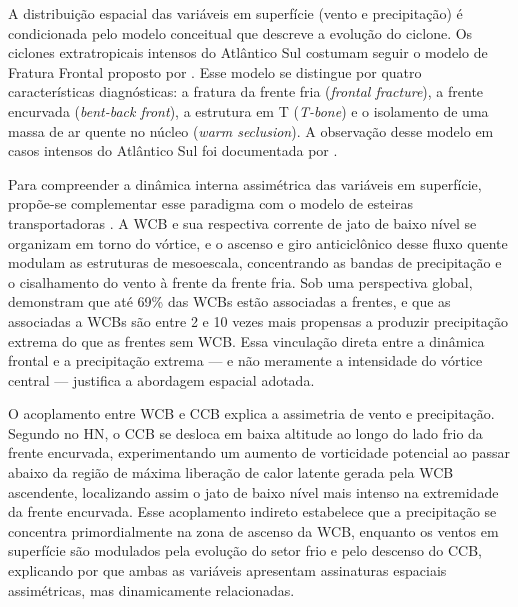 A distribuição espacial das variáveis em superfície (vento e precipitação) é condicionada pelo modelo conceitual que descreve a evolução do ciclone.
Os ciclones extratropicais intensos do Atlântico Sul costumam seguir o modelo de Fratura Frontal proposto por \citet{shapiro1990life}.
Esse modelo se distingue por quatro características diagnósticas: a fratura da frente fria (\textit{frontal fracture}), a frente encurvada (\textit{bent-back front}), a estrutura em T (\textit{T-bone}) e o isolamento de uma massa de ar quente no núcleo (\textit{warm seclusion}).
A observação desse modelo em casos intensos do Atlântico Sul foi documentada por \citet{shapiro1999bridge}.

Para compreender a dinâmica interna assimétrica das variáveis em superfície, propõe-se complementar esse paradigma com o modelo de esteiras transportadoras \citep{browning1986conceptual}.
A WCB e sua respectiva corrente de jato de baixo nível se organizam em torno do vórtice, e o ascenso e giro anticiclônico desse fluxo quente modulam as estruturas de mesoescala, concentrando as bandas de precipitação e o cisalhamento do vento à frente da frente fria.
Sob uma perspectiva global, \citet{catto2015fronts} demonstram que até 69\% das WCBs estão associadas a frentes, e que as associadas a WCBs são entre 2 e 10 vezes mais propensas a produzir precipitação extrema do que as frentes sem WCB.
Essa vinculação direta entre a dinâmica frontal e a precipitação extrema — e não meramente a intensidade do vórtice central — justifica a abordagem espacial adotada.

O acoplamento entre WCB e CCB explica a assimetria de vento e precipitação.
Segundo \citet{schemm2014ccb} no HN, o CCB se desloca em baixa altitude ao longo do lado frio da frente encurvada, experimentando um aumento de vorticidade potencial ao passar abaixo da região de máxima liberação de calor latente gerada pela WCB ascendente, localizando assim o jato de baixo nível mais intenso na extremidade da frente encurvada.
Esse acoplamento indireto estabelece que a precipitação se concentra primordialmente na zona de ascenso da WCB, enquanto os ventos em superfície são modulados pela evolução do setor frio e pelo descenso do CCB, explicando por que ambas as variáveis apresentam assinaturas espaciais assimétricas, mas dinamicamente relacionadas.


